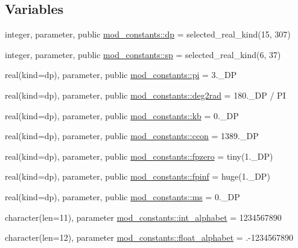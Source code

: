 \subsection*{Variables}
\begin{DoxyCompactItemize}
\item 
integer, parameter, public \hyperlink{namespacemod__constants_ac7aeda7f1802c4ef2a4780773c028214}{mod\+\_\+constants\+::dp} = selected\+\_\+real\+\_\+kind(15, 307)
\item 
integer, parameter, public \hyperlink{namespacemod__constants_af0d7aefb6fb852492ee0db77744a412d}{mod\+\_\+constants\+::sp} = selected\+\_\+real\+\_\+kind(6, 37)
\item 
real(kind=dp), parameter, public \hyperlink{namespacemod__constants_a04c6845722711f5522458ed34969cdc3}{mod\+\_\+constants\+::pi} = 3.\+\_\+\+DP
\item 
real(kind=dp), parameter, public \hyperlink{namespacemod__constants_a505a7c2ab1e1b2fa75db18a1d3e133b4}{mod\+\_\+constants\+::deg2rad} = 180.\+\_\+\+D\+P / PI
\item 
real(kind=dp), parameter, public \hyperlink{namespacemod__constants_af84a9ff68ff16d57560ea196b8e560d4}{mod\+\_\+constants\+::kb} = 0.\+\_\+\+DP
\item 
real(kind=dp), parameter, public \hyperlink{namespacemod__constants_a0943b8c8fb52658fb3d4370e5defb34b}{mod\+\_\+constants\+::ccon} = 1389.\+\_\+\+DP
\item 
real(kind=dp), parameter, public \hyperlink{namespacemod__constants_a1f06c759fc8a61d66f343865300c37d1}{mod\+\_\+constants\+::fpzero} = tiny(1.\+\_\+\+D\+P)
\item 
real(kind=dp), parameter, public \hyperlink{namespacemod__constants_a64820d61363b4adcee8f4f810662e836}{mod\+\_\+constants\+::fpinf} = huge(1.\+\_\+\+D\+P)
\item 
real(kind=dp), parameter, public \hyperlink{namespacemod__constants_ab31d074fb8a49a9991d7d6e3d4904d59}{mod\+\_\+constants\+::ms} = 0.\+\_\+\+DP
\item 
character(len=11), parameter \hyperlink{namespacemod__constants_a41cb897f7d31e58ab3c2b2f7ecf86983}{mod\+\_\+constants\+::int\+\_\+alphabet} = \textquotesingle{}1234567890\textquotesingle{}
\item 
character(len=12), parameter \hyperlink{namespacemod__constants_a4b168363a34adf3e1236769aa1ec0fed}{mod\+\_\+constants\+::float\+\_\+alphabet} = \textquotesingle{}.-\/1234567890\textquotesingle{}
\item 

\end{DoxyCompactItemize}
